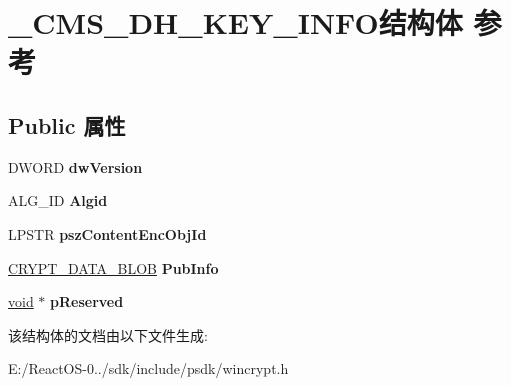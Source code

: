 \hypertarget{struct___c_m_s___d_h___k_e_y___i_n_f_o}{}\section{\+\_\+\+C\+M\+S\+\_\+\+D\+H\+\_\+\+K\+E\+Y\+\_\+\+I\+N\+F\+O结构体 参考}
\label{struct___c_m_s___d_h___k_e_y___i_n_f_o}
\subsection*{Public 属性}
\begin{DoxyCompactItemize}
\item 
\mbox{\label{struct___c_m_s___d_h___k_e_y___i_n_f_o_aa793b37b6ce20b6409852a8b91112d9c}} 
D\+W\+O\+RD {\bfseries dw\+Version}
\item 
\mbox{\label{struct___c_m_s___d_h___k_e_y___i_n_f_o_aefefe7f97048502596dbe7dd2940192e}} 
A\+L\+G\+\_\+\+ID {\bfseries Algid}
\item 
\mbox{\label{struct___c_m_s___d_h___k_e_y___i_n_f_o_a4bf963221002f05d074cc2d7b6dfb507}} 
L\+P\+S\+TR {\bfseries psz\+Content\+Enc\+Obj\+Id}
\item 
\mbox{\label{struct___c_m_s___d_h___k_e_y___i_n_f_o_a35d07b569d76a3f2a7e0672efd22a6a2}} 
\hyperlink{struct___c_r_y_p_t_o_a_p_i___b_l_o_b}{C\+R\+Y\+P\+T\+\_\+\+D\+A\+T\+A\+\_\+\+B\+L\+OB} {\bfseries Pub\+Info}
\item 
\mbox{\label{struct___c_m_s___d_h___k_e_y___i_n_f_o_a8de4efa5cb69216e6ab183c43fafdbca}} 
\hyperlink{interfacevoid}{void} $\ast$ {\bfseries p\+Reserved}
\end{DoxyCompactItemize}


该结构体的文档由以下文件生成\+:\begin{DoxyCompactItemize}
\item 
E\+:/\+React\+O\+S-\/0../sdk/include/psdk/wincrypt.\+h\end{DoxyCompactItemize}
